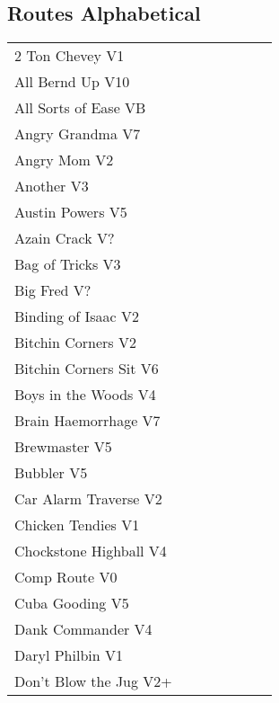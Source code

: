 \twocolumn
{}
\begin{flushleft}
\section{Routes Alphabetical}
\begin{center}
\begin{supertabular}{p{0.65\linewidth}r}
2 Ton Chevey V1 & \pageref{rt:2 Ton Chevey} \\
All Bernd Up V10 & \pageref{rt:All Bernd Up} \\
All Sorts of Ease VB & \pageref{rt:All Sorts of Ease} \\
Angry Grandma V7 & \pageref{rt:Angry Grandma} \\
Angry Mom V2 & \pageref{rt:Angry Mom} \\
Another V3 & \pageref{rt:Another} \\
Austin Powers V5 & \pageref{rt:Austin Powers} \\
Azain Crack V? & \pageref{rt:Azain Crack} \\
Bag of Tricks V3 & \pageref{vr:Bag of Tricks} \\
Big Fred V? & \pageref{rt:Big Fred} \\
Binding of Isaac V2 & \pageref{rt:Binding of Isaac} \\
Bitchin Corners V2 & \pageref{rt:Bitchin Corners} \\
Bitchin Corners Sit V6 & \pageref{vr:Bitchin Corners Sit} \\
Boys in the Woods V4 & \pageref{rt:Boys in the Woods} \\
Brain Haemorrhage V7 & \pageref{vr:Brain Haemorrhage} \\
Brewmaster V5 & \pageref{rt:Brewmaster} \\
Bubbler V5 & \pageref{rt:Bubbler} \\
Car Alarm Traverse V2 & \pageref{rt:Car Alarm Traverse} \\
Chicken Tendies V1 & \pageref{rt:Chicken Tendies} \\
Chockstone Highball V4 & \pageref{rt:Chockstone Highball} \\
Comp Route V0 & \pageref{rt:Comp Route} \\
Cuba Gooding V5 & \pageref{rt:Cuba Gooding} \\
Dank Commander V4 & \pageref{rt:Dank Commander} \\
Daryl Philbin V1 & \pageref{rt:Daryl Philbin} \\
Don't Blow the Jug V2+ & \pageref{rt:Don't Blow the Jug} \\

\end{supertabular}
\end{center}
\end{flushleft}
